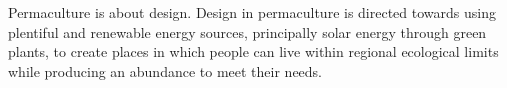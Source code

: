 \documentclass[a4paper, 11pt]{article}
\begin{document}
Permaculture is about design.  Design in permaculture is directed towards using plentiful and renewable energy sources, principally solar energy through green plants, to create places in which people can live within regional ecological limits while producing an abundance to meet their needs.
\begin{comment}
\begin{quote}
\begin{quote}
        ``As the capitalist mode of production enters its worst crisis since the 1930s, peasant and small farmers increasingly present a vision of autonomy, diversity, and cooperation that may just be the key elements of a necessary social and economic reorganisation.'' --- \textsc{Bello and Baviera} --- Food Wars in \textsc{Magdoff and Tokar} --- Agriculture and Food Crisis, p49
\end{quote}

\begin{quote}
    ``Nobody is smart enough to plan a society.  You can talk about some of the principles upon which a society should work, and you can set up guidelines as to how to implement them, and how to experiment with them, and there are probably many different ways of doing them.  There's no reason to believe that there's only one right answer; there are lots of different answers, with advantages and disadvantages, and people have to choose between them on the basis of experience, what has happened to others, and so on.  This is true in every area.'' \textsc{Noam Chomsky} in \textsc{Pannekoek}, Workers' Councils p xi
\end{quote}

    ``Ecologically, bourgeois exploitation and manipulation are undermining the very capacity of the earth to sustain advanced forms of life.'' --- \textsc{Bookchin}, PSA p58
\end{quote}


\end{comment}
\end{document}
